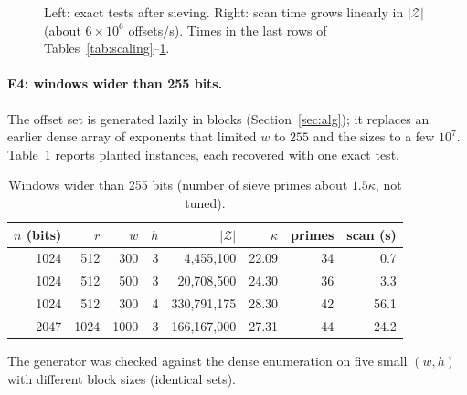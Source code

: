 \documentclass[11pt,a4paper]{article}
\begin{document}
\begin{figure}[ht]\centering
{}\hfill
{}
\caption{Left: exact tests after sieving. Right: scan time grows linearly in $|\mathcal Z|$ (about $6\times10^{6}$ offsets/s). Times in the last rows of Tables~\ref{tab:scaling}--\ref{tab:bigw}.}\label{fig:primes}
\end{figure}

\paragraph{E4: windows wider than 255 bits.} The offset set is generated lazily in blocks (Section~\ref{sec:alg}); it replaces an earlier dense array of exponents that limited $w$ to $255$ and the sizes to a few $10^7$. Table~\ref{tab:bigw} reports planted instances, each recovered with one exact test.
\begin{table}[ht]\centering\small
\caption{Windows wider than 255 bits (number of sieve primes about $1.5\kappa$, not tuned).}\label{tab:bigw}
\begin{tabular}{@{}rrrrrrrr@{}}\toprule
$n$ (bits) & $r$ & $w$ & $h$ & $|\mathcal Z|$ & $\kappa$ & primes & scan (s)\\\midrule
1024 & 512 & 300 & 3 & 4,455,100 & 22.09 & 34 & 0.7\\
1024 & 512 & 500 & 3 & 20,708,500 & 24.30 & 36 & 3.3\\
1024 & 512 & 300 & 4 & 330,791,175 & 28.30 & 42 & 56.1\\
2047 & 1024 & 1000 & 3 & 166,167,000 & 27.31 & 44 & 24.2\\\bottomrule
\end{tabular}
\end{table}
The generator was checked against the dense enumeration on five small $(w,h)$ with different block sizes (identical sets).
\end{document}

